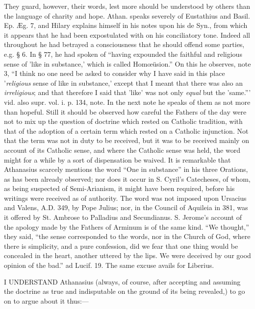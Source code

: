 They guard, however, their words, lest more
should be understood by others than the language of charity and hope.
Athan. speaks severely of Eustathius and Basil. Ep. Æg. 7, and Hilary
explains himself in his notes upon his de Syn., from which it appears
that he had been expostulated with on his conciliatory tone. Indeed
all throughout he had betrayed a consciousness that he should offend
some parties, e.g. § 6. In § 77, he had spoken of ``having expounded
the faithful and religious sense of 'like in substance,' which is
called Homœüsion.'' On this he observes, note 3, ``I think no one need
be asked to consider why I have said in this place '\emph{religious}
sense of like in substance,' except that I meant that there was also
an \emph{irreligious}; and that therefore I said that 'like' was not
only \emph{equal} but the 'same.''' vid. also supr. vol. i. p. 134,
note. In the next note he speaks of them as not more than
hopeful. Still it should be observed how careful the Fathers of the
day were not to mix up the question of doctrine which rested on
Catholic tradition, with that of the adoption of a certain term which
rested on a Catholic injunction. Not that the term was not in duty to
be received, but it was to be received mainly on account of its
Catholic sense, and where the Catholic sense was held, the word might
for a while by a sort of dispensation be waived. It is remarkable that
Athanasius scarcely mentions the word ``One in substance'' in his three
Orations, as has been already observed; nor does it occur in S. Cyril's
Catecheses, of whom, as being suspected of Semi-Arianism, it might
have been required, before his writings were received as of authority.
The word was not imposed upon Ursacius and Valens, A.D. 349, by Pope Julius; nor, in the Council
of Aquileia in 381, was it offered by St. Ambrose to Palladius and
Secundianus. S. Jerome's account of the apology made by the Fathers of
Arminum is of the same kind. ``We thought,'' they said, ``the sense
corresponded to the words, nor in the Church of God, where there is
simplicity, and a pure confession, did we fear that one thing would be
concealed in the heart, another uttered by the lips. We were deceived
by our good opinion of the bad.'' ad Lucif. 19. The same excuse avails
for Liberius.


I UNDERSTAND
Athanasius (always, of course, after accepting and assuming the
doctrine as true and indisputable on the ground of its being
revealed,) to go on to argue about it thus:—

